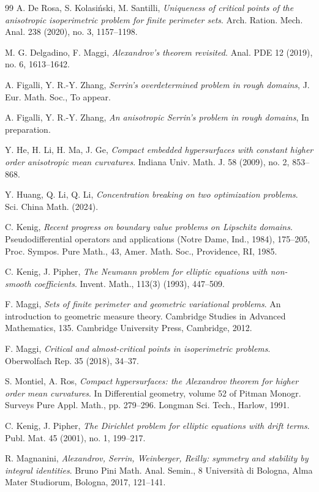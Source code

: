\documentclass[reqno,11pt]{amsart}
\numberwithin{equation}{section}
\theoremstyle{remark}
\begin{document}
\begin{thebibliography}{99}
A. De Rosa, S.  Kolasi\'nski, M. Santilli, \emph{Uniqueness of critical points of the anisotropic isoperimetric problem for finite perimeter sets}. Arch. Ration. Mech. Anal. 238 (2020), no. 3, 1157--1198.

M. G. Delgadino,  F. Maggi, 
\emph{Alexandrov's theorem revisited. }
Anal. PDE 12 (2019), no. 6, 1613--1642.

A. Figalli, Y. R.-Y. Zhang, \emph{Serrin's overdetermined problem in rough domains}, J. Eur. Math. Soc., To appear.

A. Figalli, Y. R.-Y. Zhang, \emph{An anisotropic Serrin's problem in rough domains}, In preparation. 

Y. He, H. Li, H. Ma, J. Ge, \emph{Compact embedded hypersurfaces with constant higher order anisotropic mean curvatures}. Indiana Univ. Math. J. 58 (2009), no. 2, 853--868.

 Y. Huang, Q. Li, Q. Li, \emph{Concentration breaking on two optimization problems}. Sci. China Math. (2024).

C. Kenig, \emph{Recent progress on boundary value problems on Lipschitz domains}. Pseudodifferential operators and applications (Notre Dame, Ind., 1984), 175--205, Proc. Sympos. Pure Math., 43, Amer. Math. Soc., Providence, RI, 1985.

C. Kenig, J. Pipher, \emph{The Neumann problem for elliptic equations with non-smooth coefficients}.
 Invent. Math., 113(3)  (1993), 447--509.

F. Maggi, 
\emph{Sets of finite perimeter and geometric variational problems}. 
An introduction to geometric measure theory. Cambridge Studies in Advanced Mathematics, 135. Cambridge University Press, Cambridge, 2012. 

F. Maggi, \emph{Critical and almost-critical points in isoperimetric problems}. Oberwolfach Rep. 35 (2018), 34--37.  

S. Montiel,  A. Ros, \emph{Compact hypersurfaces: the Alexandrov theorem for higher order mean curvatures}. In Differential geometry, volume 52 of Pitman Monogr. Surveys Pure Appl. Math., pp. 279--296. Longman Sci. Tech., Harlow, 1991.

C.  Kenig, J. Pipher, \emph{The Dirichlet problem for elliptic equations with drift terms}. Publ. Mat. 45 (2001), no. 1, 199--217.


R. Magnanini,
\emph{Alexandrov, Serrin, Weinberger, Reilly: symmetry and stability by integral identities}. 
Bruno Pini Math. Anal. Semin., 8
Universit\`a di Bologna, Alma Mater Studiorum, Bologna, 2017, 121--141.


\end{thebibliography}
\end{document}

